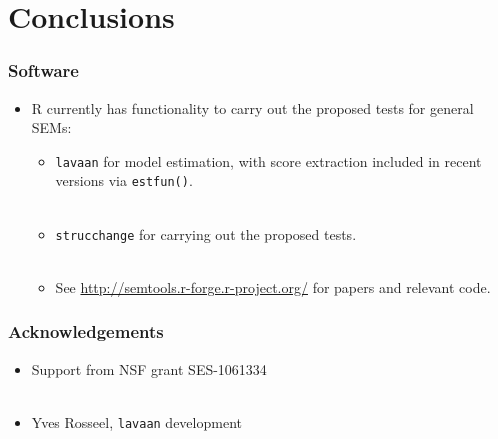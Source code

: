 \documentclass{beamer}
\begin{document}
\section{Conclusions}

\begin{frame}[fragile]
  \frametitle{Software}
  \begin{itemize}
    \item R currently has functionality to carry out the proposed
      tests for general SEMs:
      \begin{itemize}
        \item \texttt{lavaan} for model estimation, with score
          extraction included in recent versions via \verb+estfun()+.\\ \ \\
        \item \texttt{strucchange} for carrying out the proposed
          tests.\\ \ \\
        \item See \url{http://semtools.r-forge.r-project.org/} for
          papers and relevant code.
      \end{itemize}
  \end{itemize}
\end{frame}

\begin{frame}[fragile]
  \frametitle{Acknowledgements}
  \begin{itemize}
    \item Support from NSF grant SES-1061334\\ \ \\
    \item Yves Rosseel, \verb+lavaan+ development\\ \ \\
  \end{itemize}
\end{frame}

\end{document}
